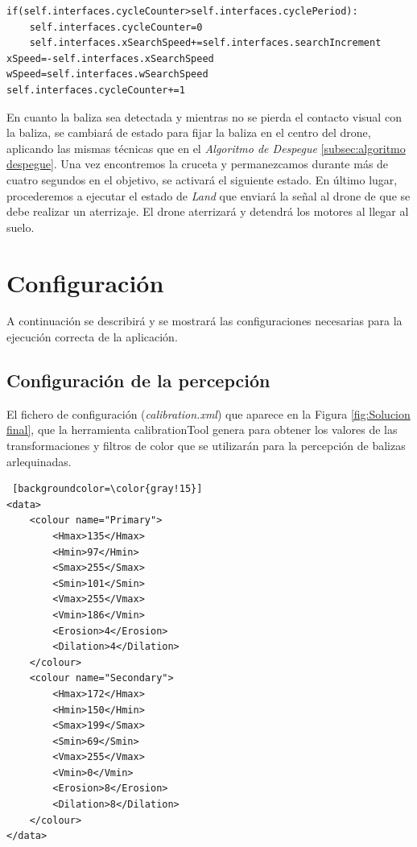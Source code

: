 \begin{lstlisting}[backgroundcolor=\color{gray!15}]
if(self.interfaces.cycleCounter>self.interfaces.cyclePeriod):
    self.interfaces.cycleCounter=0
    self.interfaces.xSearchSpeed+=self.interfaces.searchIncrement
xSpeed=-self.interfaces.xSearchSpeed
wSpeed=self.interfaces.wSearchSpeed        
self.interfaces.cycleCounter+=1
\end{lstlisting}

En cuanto la baliza sea detectada y mientras no se pierda el contacto visual con la baliza, se cambiará de estado para fijar la baliza en el centro del drone, aplicando las mismas técnicas que en el \textit{Algoritmo de Despegue} \ref{subsec:algoritmo despegue}. Una vez encontremos la cruceta y permanezcamos durante más de cuatro segundos en el objetivo, se activará el siguiente estado. 
En último lugar, procederemos a ejecutar el estado de \textit{Land} que enviará la señal al drone de que se debe realizar un aterrizaje. El drone aterrizará y detendrá los motores al llegar al suelo.  

\section{Configuración}

A continuación se describirá y se mostrará las configuraciones necesarias para la ejecución correcta de la aplicación.

\subsection{Configuración de la percepción}

El fichero de configuración (\textit{calibration.xml}) que aparece en la Figura \ref{fig:Solucion final}, que la herramienta calibrationTool genera para obtener los valores de las transformaciones y filtros de color que se utilizarán para la percepción de balizas arlequinadas.

\begin{lstlisting} [backgroundcolor=\color{gray!15}]
<data>
	<colour name="Primary">
		<Hmax>135</Hmax>
		<Hmin>97</Hmin>
		<Smax>255</Smax>
		<Smin>101</Smin>
		<Vmax>255</Vmax>
		<Vmin>186</Vmin>
		<Erosion>4</Erosion>
		<Dilation>4</Dilation>
	</colour>
	<colour name="Secondary">
		<Hmax>172</Hmax>
		<Hmin>150</Hmin>
		<Smax>199</Smax>
		<Smin>69</Smin>
		<Vmax>255</Vmax>
		<Vmin>0</Vmin>
		<Erosion>8</Erosion>
		<Dilation>8</Dilation>
	</colour>
</data>
\end{lstlisting}

